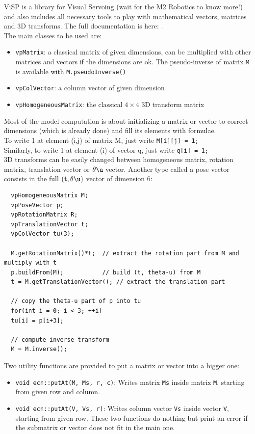 \documentclass{ecnreport}
\begin{document}
  ViSP is a library for Visual Servoing (wait for the M2 Robotics to know more!) and also includes all necessary tools to play with mathematical vectors, matrices and 3D transforms.
  The full documentation is here: .\\
  The main classes to be used are:
  \begin{itemize}
    \item \texttt{vpMatrix}: a classical matrix of given dimensions, can be multiplied with other matrices and vectors if the dimensions are ok. The pseudo-inverse of matrix \texttt{M} 
    is available with \texttt{M.pseudoInverse()}
    \item \texttt{vpColVector}: a column vector of given dimension
    \item \texttt{vpHomogeneousMatrix}: the classical $4\times 4$ 3D transform matrix
  \end{itemize}
  Most of the model computation is about initializing a matrix or vector to correct dimensions (which is already done) and fill its elements with formulae.\\
  To write 1 at element (i,j) of matrix M, just write \texttt{M[i][j] = 1;}\\
  Similarly, to write 1 at element (i) of vector q, just write \texttt{q[i] = 1;}\\
  
  3D transforms can be easily changed between homogeneous matrix, rotation matrix, translation vector or $\theta\u$ vector. Another type called a pose vector
  consists in the full $(\mathbf{t}, \theta\u)$ vector of dimension 6:
  \cppstyle
  \begin{lstlisting}
  vpHomogeneousMatrix M;
  vpPoseVector p;
  vpRotationMatrix R;
  vpTranslationVector t;
  vpColVector tu(3);
  
  M.getRotationMatrix()*t;	// extract the rotation part from M and multiply with t
  p.buildFrom(M);			// build (t, theta-u) from M
  t = M.getTranslationVector();	// extract the translation part
  
  // copy the theta-u part of p into tu
  for(int i = 0; i < 3; ++i)
  tu[i] = p[i+3];
  
  // compute inverse transform
  M = M.inverse();
  \end{lstlisting}
  
  Two utility functions are provided to put a matrix or vector into a bigger one:
  \begin{itemize}
    \item \texttt{void ecn::putAt(M, Ms, r, c)}: Writes matrix \texttt{Ms} inside matrix \texttt{M}, starting from given row and column.
    \item \texttt{void ecn::putAt(V, Vs, r)}: Writes column vector \texttt{Vs} inside vector \texttt{V}, starting from given row. These two functions do nothing but print an error
    if the submatrix or vector does not fit in the main one.
  \end{itemize}
  
\end{document}
